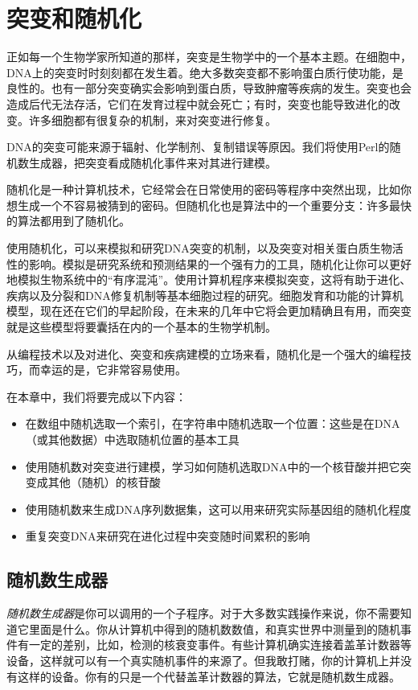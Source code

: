 \chapter{突变和随机化}
\label{chap:chapter7}
\minitoc

正如每一个生物学家所知道的那样，突变是生物学中的一个基本主题。在细胞中，DNA上的突变时时刻刻都在发生着。绝大多数突变都不影响蛋白质行使功能，是良性的。也有一部分突变确实会影响到蛋白质，导致肿瘤等疾病的发生。突变也会造成后代无法存活，它们在发育过程中就会死亡；有时，突变也能导致进化的改变。许多细胞都有很复杂的机制，来对突变进行修复。

DNA的突变可能来源于辐射、化学制剂、复制错误等原因。我们将使用Perl的随机数生成器，把突变看成随机化事件来对其进行建模。

随机化是一种计算机技术，它经常会在日常使用的密码等程序中突然出现，比如你想生成一个不容易被猜到的密码。但随机化也是算法中的一个重要分支：许多最快的算法都用到了随机化。

使用随机化，可以来模拟和研究DNA突变的机制，以及突变对相关蛋白质生物活性的影响。模拟是研究系统和预测结果的一个强有力的工具，随机化让你可以更好地模拟生物系统中的“有序混沌”。使用计算机程序来模拟突变，这将有助于进化、疾病以及分裂和DNA修复机制等基本细胞过程的研究。细胞发育和功能的计算机模型，现在还在它们的早起阶段，在未来的几年中它将会更加精确且有用，而突变就是这些模型将要囊括在内的一个基本的生物学机制。

从编程技术以及对进化、突变和疾病建模的立场来看，随机化是一个强大的编程技巧，而幸运的是，它非常容易使用。

在本章中，我们将要完成以下内容：

\begin{itemize}
  \item 在数组中随机选取一个索引，在字符串中随机选取一个位置：这些是在DNA（或其他数据）中选取随机位置的基本工具
  \item 使用随机数对突变进行建模，学习如何随机选取DNA中的一个核苷酸并把它突变成其他（随机）的核苷酸
  \item 使用随机数来生成DNA序列数据集，这可以用来研究实际基因组的随机化程度
  \item 重复突变DNA来研究在进化过程中突变随时间累积的影响
\end{itemize}

\section{随机数生成器}
\textit{随机数生成器}是你可以调用的一个子程序。对于大多数实践操作来说，你不需要知道它里面是什么。你从计算机中得到的随机数数值，和真实世界中测量到的随机事件有一定的差别，比如，检测的核衰变事件。有些计算机确实连接着盖革计数器等设备，这样就可以有一个真实随机事件的来源了。但我敢打赌，你的计算机上并没有这样的设备。你有的只是一个代替盖革计数器的算法，它就是随机数生成器。

